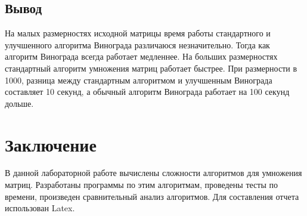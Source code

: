 \documentclass[12pt]{article}
\begin{document}
\subsection{Вывод}
На малых размерностях исходной матрицы время работы стандартного и улучшенного алгоритма Винограда различаюся незначительно. Тогда как алгоритм Винограда всегда работает медленнее. На больших размерностях стандартный алгоритм умножения матриц работает быстрее. При размерности в 1000, разница между стандартным алгоритмом и улучшенным Винограда составляет 10 секунд, а обычный алгоритм Винограда работает на 100 секунд дольше.
\newpage
\section{Заключение}
В данной лабораторной работе вычислены сложности алгоритмов для умножения матриц. Разработаны программы по этим алгоритмам, проведены тесты по времени, произведен сравнительный анализ алгоритмов. Для составления отчета использован Latex.
\\
\end{document}
